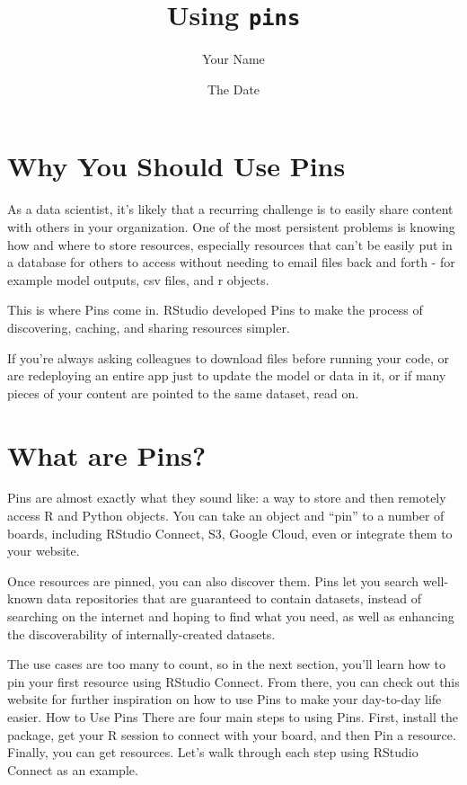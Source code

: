 \documentclass[
]{article}
\title{Using \texttt{pins}}
\author{Your Name}
\date{The Date}
\begin{document}
\maketitle

\hypertarget{why-you-should-use-pins}{%
\section{Why You Should Use Pins}\label{why-you-should-use-pins}}

As a data scientist, it's likely that a recurring challenge is to easily
share content with others in your organization. One of the most
persistent problems is knowing how and where to store resources,
especially resources that can't be easily put in a database for others
to access without needing to email files back and forth - for example
model outputs, csv files, and r objects.

This is where Pins come in. RStudio developed Pins to make the process
of discovering, caching, and sharing resources simpler.

If you're always asking colleagues to download files before running your
code, or are redeploying an entire app just to update the model or data
in it, or if many pieces of your content are pointed to the same
dataset, read on.

\hypertarget{what-are-pins}{%
\section{What are Pins?}\label{what-are-pins}}

Pins are almost exactly what they sound like: a way to store and then
remotely access R and Python objects. You can take an object and ``pin''
to a number of boards, including RStudio Connect, S3, Google Cloud, even
or integrate them to your website.

Once resources are pinned, you can also discover them. Pins let you
search well-known data repositories that are guaranteed to contain
datasets, instead of searching on the internet and hoping to find what
you need, as well as enhancing the discoverability of internally-created
datasets.

The use cases are too many to count, so in the next section, you'll
learn how to pin your first resource using RStudio Connect. From there,
you can check out this website for further inspiration on how to use
Pins to make your day-to-day life easier. How to Use Pins There are four
main steps to using Pins. First, install the package, get your R session
to connect with your board, and then Pin a resource. Finally, you can
get resources. Let's walk through each step using RStudio Connect as an
example.
\end{document}
